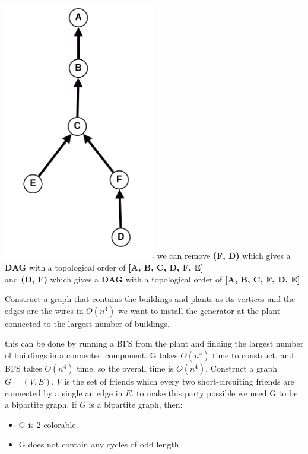 \documentclass[12pt,twoside]{article}
\begin{document}
\begin{problems}
\begin{problemparts}
\includegraphics[width=0.5\textwidth]{./imgs/img3.png} 
\problempart %
  we can remove \textbf{(F, D)} which gives a \textbf{DAG} with a topological order of \textbf{[A, B, C, D, F, E]}\\
  and \textbf{(D, F)} which gives a \textbf{DAG} with a topological order of \textbf{[A, B, C, F, D, E]}\\
\end{problemparts}

\newpage
\problem  %
Construct a graph that contains the buildings and plants as its vertices and the edges are the wires in $O(n^4)$
we want to install the generator at the plant connected to the largest number of buildings.

this can be done by running a BFS from the plant and finding the largest number of buildings in a connected component.
  G takes $O(n^4)$ time to construct. and BFS takes $O(n^4)$ time, so the overall time is $O(n^4)$.
\newpage
\problem  %
  Construct a graph $G = (V, E)$, $V$ is the set of friends which every two short-circuiting 
  friends are connected by a single an edge in $E$. to make this party possible we need G to be a bipartite graph.
  if $G$ is a bipartite graph, then: 
  \begin{itemize}
    \item G is 2-colorable. 
    \item G does not contain any cycles of odd length.
  \end{itemize}
  

\end{problems}
\end{document}
